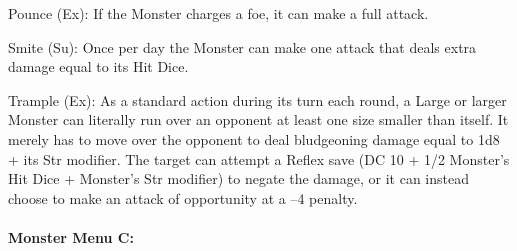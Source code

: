 \begin{list}{}{\leftmargin=1em}
\item Pounce (Ex): If the Monster charges a foe, it can make a full attack. 
\item Smite (Su): Once per day the Monster can make one attack that deals extra damage equal to its Hit Dice.
\item Trample (Ex): As a standard action during its turn each round, 
a Large or larger Monster can literally run over an opponent at least one size smaller than itself. 
It merely has to move over the opponent to deal bludgeoning damage equal to 1d8 + its Str modifier. 
The target can attempt a Reflex save (DC 10 + 1/2 Monster's Hit Dice + Monster's Str modifier) 
to negate the damage, or it can instead choose to make an attack of opportunity at a –4 penalty.
\end{list}

\paragraph{Monster Menu C:}

